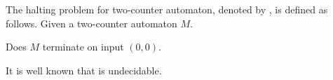 \begin{definition}
The halting problem for two-counter automaton, denoted by \autHalt{}, is defined as follows.
Given a two-counter automaton $M$. 
\begin{center}
Does $M$ terminate on input $(0,0)$.
\end{center}
\end{definition}
It is well known that \autHalt{} is undecidable. %